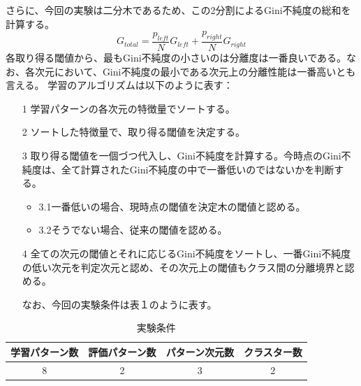 \documentclass[ %
  uplatex,%
  papersize%
]{jsarticle}
\begin{document}
さらに、今回の実験は二分木であるため、この2分割によるGini不純度の総和を計算する。
$$G_{total}= \frac{p_{left}}{N}G_{left}+ \frac{p_{right}}{N}G_{right}  $$
各取り得る閾値から、最もGini不純度の小さいのは分離度は一番良いである。なお、各次元において、Gini不純度の最小である次元上の分離性能は一番高いとも言える。
学習のアルゴリズムは以下のように表す：
\begin{itemize}
\footnotesize
\item[1] 学習パターンの各次元の特徴量でソートする。
\item[2] ソートした特徴量で、取り得る閾値を決定する。
\item[3] 取り得る閾値を一個づつ代入し、Gini不純度を計算する。今時点のGini不純度は、全て計算されたGini不純度の中で一番低いのではないかを判断する。
\begin{itemize}
\footnotesize
\item3.1一番低いの場合、現時点の閾値を決定木の閾値と認める。
\item3.2そうでない場合、従来の閾値を認める。
\end{itemize}
\item[4] 全ての次元の閾値とそれに応じるGini不純度をソートし、一番Gini不純度の低い次元を判定次元と認め、その次元上の閾値もクラス間の分離境界と認める。

なお、今回の実験条件は表１のように表す。
\end{itemize}
\begin{table}[h]\footnotesize
\caption{実験条件}
\label{}
\centering
\begin{tabular}{|c|c|c|c|}
\hline
学習パターン数&評価パターン数&パターン次元数&クラスター数\\
\hline
8&2&3&2\\
\hline
\end{tabular} 
\end{table}
\end{document}
